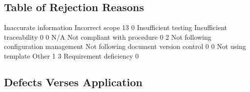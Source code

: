 \documentclass{article}
\begin{document}
\subsection{Table of Rejection Reasons}
\begin{Schunk}
\begin{Soutput}
                Inaccurate information                        Incorrect scope 
                                    13                                      0 
                  Insufficient testing              Insufficient traceability 
                                     0                                      0 
                                   N/A           Not compliant with procedure 
                                     0                                      2 
Not following configuration management Not following document version control 
                                     0                                      0 
                    Not using template                                  Other 
                                     1                                      3 
                Requirement deficiency 
                                     0 
\end{Soutput}
\end{Schunk}

\subsection{Defects Verses Application}
\end{document}
